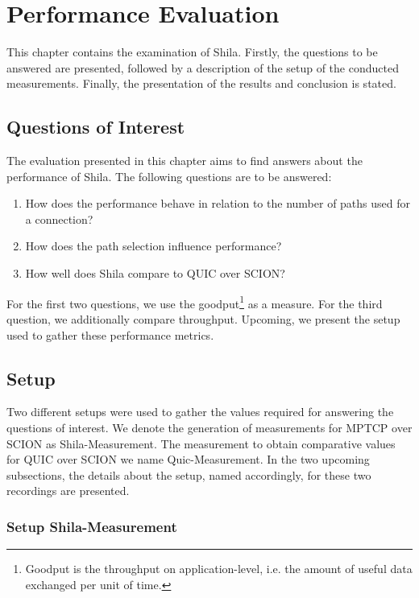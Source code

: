 \chapter{Performance Evaluation}
\label{chap:PerformanceEvaluation}

This chapter contains the examination of Shila. Firstly, the questions to be answered are presented, followed by a description of the setup of the conducted measurements. Finally, the presentation of the results and conclusion is stated.

\section{Questions of Interest}
\label{sec:QuestionsOfInterest}

The evaluation presented in this chapter aims to find answers about the performance of Shila. The following questions are to be answered:

{\small \begin{enumerate}
	\item How does the performance behave in relation to the number of paths used for a connection?
	\item How does the path selection influence performance?
	\item How well does Shila compare to QUIC over SCION?
\end{enumerate}}

For the first two questions, we use the goodput\footnote{Goodput is the throughput on application-level, i.e. the amount of useful data exchanged per unit of time.} as a measure. For the third question, we additionally compare throughput. Upcoming, we present the setup used to gather these performance metrics.

\section{Setup}
\label{subsec:Setup}

Two different setups were used to gather the values required for answering the questions of interest. We denote the generation of measurements for MPTCP over SCION as Shila-Measurement. The measurement to obtain comparative values for QUIC over SCION we name Quic-Measurement. In the two upcoming subsections, the details about the setup, named accordingly, for these two recordings are presented.

\subsection*{Setup Shila-Measurement} 


